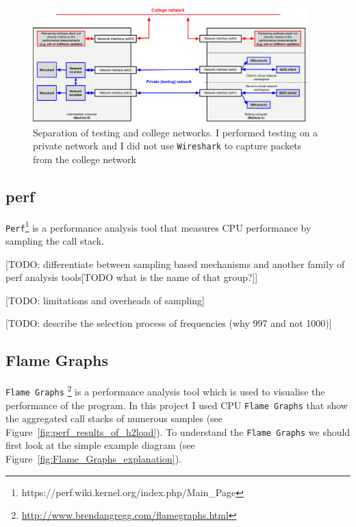 \documentclass[12pt,a4paper,twoside,openright]{report}
\begin{document}
    \begin{figure}[H]
    \centering
    \includegraphics[width=0.95\textwidth]{figs/Wireshark_separation.png}
    \caption[Separation of testing and college networks]{Separation of testing and college networks. I performed testing on a private network and I did not use \texttt{Wireshark} to capture packets from the college network}
    \label{fig:Wireshark_separation}
    \end{figure}



\subsection{perf}
\texttt{Perf}\footnote{https://perf.wiki.kernel.org/index.php/Main\_Page} is a performance analysis tool that measures CPU performance by sampling the call stack.

[TODO: differentiate between sampling based mechanisms and another family of perf analysis tools[TODO what is the name of that group?]]

[TODO: limitations and overheads of sampling]

[TODO: describe the selection process of frequencies (why 997 and not 1000)]



\subsection{Flame Graphs}
\texttt{Flame Graphs} \footnote{\url{http://www.brendangregg.com/flamegraphs.html}} is a performance analysis tool which is used to visualise the performance of the program.
In this project I used CPU \texttt{Flame Graphs} that show the aggregated call stacks of numerous samples (see Figure~\ref{fig:perf_results_of_h2load}).
To understand the \texttt{Flame Graphs} we should first look at the simple example diagram (see Figure~\ref{fig:Flame_Graphs_explanation}).
\end{document}
